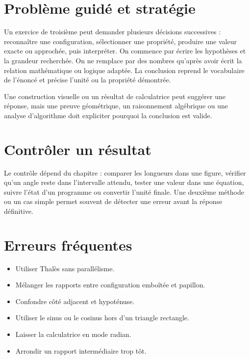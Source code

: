 \section{Problème guidé et stratégie}
Un exercice de troisième peut demander plusieurs décisions successives : reconnaître une configuration, sélectionner une propriété, produire une valeur exacte ou approchée, puis interpréter. On commence par écrire les hypothèses et la grandeur recherchée. On ne remplace par des nombres qu’après avoir écrit la relation mathématique ou logique adaptée. La conclusion reprend le vocabulaire de l’énoncé et précise l’unité ou la propriété démontrée.

\begin{attention}
Une construction visuelle ou un résultat de calculatrice peut suggérer une réponse, mais une preuve géométrique, un raisonnement algébrique ou une analyse d’algorithme doit expliciter pourquoi la conclusion est valide.
\end{attention}

\section{Contrôler un résultat}
Le contrôle dépend du chapitre : comparer les longueurs dans une figure, vérifier qu’un angle reste dans l’intervalle attendu, tester une valeur dans une équation, suivre l’état d’un programme ou convertir l’unité finale. Une deuxième méthode ou un cas simple permet souvent de détecter une erreur avant la réponse définitive.

\section{Erreurs fréquentes}
\begin{itemize}
\item Utiliser Thalès sans parallélisme.
\item Mélanger les rapports entre configuration emboîtée et papillon.
\item Confondre côté adjacent et hypoténuse.
\item Utiliser le sinus ou le cosinus hors d’un triangle rectangle.
\item Laisser la calculatrice en mode radian.
\item Arrondir un rapport intermédiaire trop tôt.
\end{itemize}

